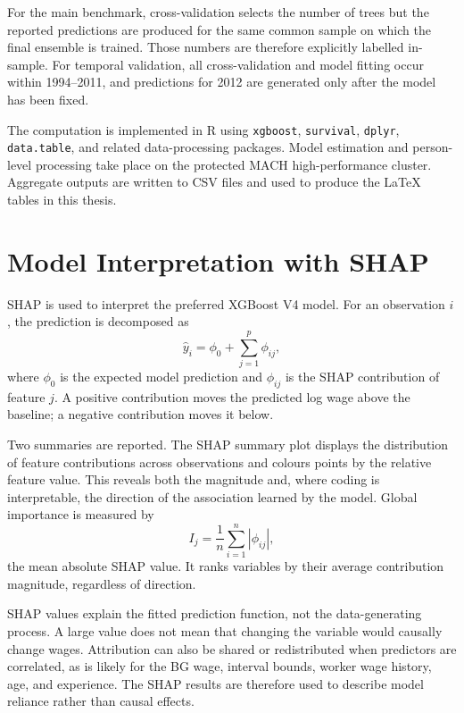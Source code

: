 \documentclass[12pt,a4paper,oneside,titlepage]{book}
\begin{document}
For the main benchmark, cross-validation selects the number of trees but the reported predictions are produced for the same common sample on which the final ensemble is trained. Those numbers are therefore explicitly labelled in-sample. For temporal validation, all cross-validation and model fitting occur within 1994--2011, and predictions for 2012 are generated only after the model has been fixed.

The computation is implemented in R using \texttt{xgboost}, \texttt{survival}, \texttt{dplyr}, \texttt{data.table}, and related data-processing packages. Model estimation and person-level processing take place on the protected MACH high-performance cluster. Aggregate outputs are written to CSV files and used to produce the LaTeX tables in this thesis.

\section{Model Interpretation with SHAP}
\label{sec:shap}
SHAP is used to interpret the preferred XGBoost V4 model. For an observation $i$, the prediction is decomposed as
\begin{equation}
  \widehat y_i=\phi_0+\sum_{j=1}^{p}\phi_{ij},
\end{equation}
where $\phi_0$ is the expected model prediction and $\phi_{ij}$ is the SHAP contribution of feature $j$. A positive contribution moves the predicted log wage above the baseline; a negative contribution moves it below.

Two summaries are reported. The SHAP summary plot displays the distribution of feature contributions across observations and colours points by the relative feature value. This reveals both the magnitude and, where coding is interpretable, the direction of the association learned by the model. Global importance is measured by
\begin{equation}
  I_j=\frac{1}{n}\sum_{i=1}^{n}|\phi_{ij}|,
\end{equation}
the mean absolute SHAP value. It ranks variables by their average contribution magnitude, regardless of direction.

SHAP values explain the fitted prediction function, not the data-generating process. A large value does not mean that changing the variable would causally change wages. Attribution can also be shared or redistributed when predictors are correlated, as is likely for the BG wage, interval bounds, worker wage history, age, and experience. The SHAP results are therefore used to describe model reliance rather than causal effects.
\end{document}
